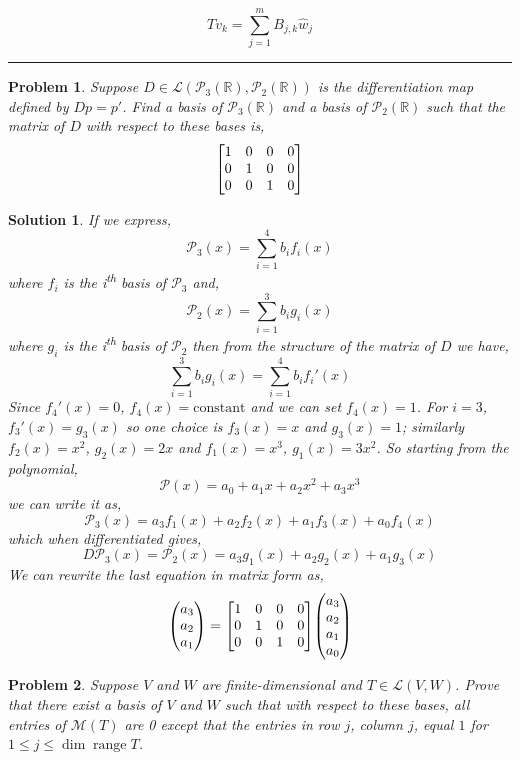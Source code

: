 \documentclass[11pt,a4paper]{scrartcl}
\DeclareMathOperator{\range}{range}
\newcommand{\lmap}[2]{\mathcal{L}(#1,#2)}
\theoremstyle{solve}
\newtheorem{problem}{Problem}
\newtheorem*{solution}{Solution}
\begin{document}
\begin{equation}
    Tv_k = \sum_{j=1}^m B_{j,k} {\hat w}_j 
\end{equation}
\newline\noindent\rule{\textwidth}{0.5pt}
\vspace{1cm}
\begin{problem}
    Suppose $D \in \lmap{\mathcal{P}_3(\mathbb{R})}{\mathcal{P}_2(\mathbb{R})}$ is the differentiation map defined by
    $Dp=p'$. Find a basis of $\mathcal{P}_3(\mathbb{R})$ and a basis of
    $\mathcal{P}_2(\mathbb{R})$ such that the matrix of $D$ with
    respect to these bases is,
    \[
        \mqty[
        1 & 0 & 0 & 0 \\
        0 & 1 & 0 & 0 \\
        0 & 0 & 1 & 0 \\        
        ]
    \]
\end{problem}
\begin{solution}
    If we express,
    \[
    \mathcal{P}_3(x)=\sum_{i=1}^4 b_i f_i(x)
    \]
    where $f_i$ is the i\textsuperscript{th} basis of $\mathcal{P}_3$ and,
    \[
    \mathcal{P}_2(x)=\sum_{i=1}^3 b_i g_i(x)
    \]    
    where $g_i$ is the i\textsuperscript{th} basis of $\mathcal{P}_2$
    then from the structure of the matrix of $D$ we have,
    \[
    \sum_{i=1}^3 b_i g_i(x) = \sum_{i=1}^4 b_i f_i'(x)
    \]
    Since $f_4'(x)=0$, $f_4(x)=\mathrm{constant}$ and we can set
    $f_4(x)=1$. For $i=3$, $f_3'(x)=g_3(x)$ so one choice is 
    $f_3(x)=x$ and $g_3(x)=1$; similarly $f_2(x)=x^2$, $g_2(x)=2x$
    and $f_1(x)=x^3$, $g_1(x)=3x^2$. So starting from the polynomial,
    \[
    \mathcal{P}(x)=a_0+a_1x+a_2x^2+a_3x^3
    \]
    we can write it as,
    \[
    \mathcal{P}_3(x)=a_3 f_1(x)+ a_2 f_2(x) + a_1 f_3(x) + a_0 f_4(x)
    \]
    which when differentiated gives,
    \[
    D\mathcal{P}_3(x)=\mathcal{P}_2(x)=a_3 g_1(x)+ a_2 g_2(x) + a_1 g_3(x)   
    \]
    We can rewrite the last equation in matrix form as,
    \[
    \mqty(a_3 \\ a_2 \\ a_1)
    =
           \mqty[
        1 & 0 & 0 & 0 \\
        0 & 1 & 0 & 0 \\
        0 & 0 & 1 & 0 \\        
        ] 
     \mqty(a_3 \\ a_2 \\ a_1 \\ a_0)   
    \]
\end{solution}
\begin{problem}
    Suppose $V$ and $W$ are finite-dimensional and $T \in \lmap{V}{W}$.
    Prove that there exist a basis of $V$ and $W$ such that with respect
    to these bases, all entries of $\mathcal{M}(T)$ are 0 except that the entries in row $j$, column $j$, equal $1$ for $1\leq j\leq \dim \range T$. 
\end{problem}
\end{document}
